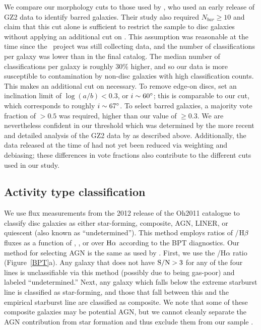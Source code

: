 We compare our morphology cuts to those used by \citet{Masters2011}, who used an early release of GZ2 data to identify barred galaxies. Their study also required $N_{bar}\ge10$ and claim that this cut alone is sufficient to restrict the sample to disc galaxies without applying an additional cut on \pfeatures. This assumption was reasonable at the time since the \gztwo~project was still collecting data, and the number of classifications per galaxy was lower than in the final catalog. The median number of classifications per galaxy is roughly 30\% higher, and so our data is more susceptible to contamination by non-disc galaxies with high classification counts. This makes an additional cut on \pfeatures necessary. To remove edge-on discs, \citet{Masters2011} set an inclination limit of $\log(a/b)<0.3$, or $i\sim60\mbox{$^\circ$}$; this is comparable to our \pnotedgeon cut, which corresponds to roughly $i\sim67\mbox{$^\circ$}$. To select barred galaxies, a majority vote fraction of \pbar$>0.5$ was required, higher than our value of \pbar$\ge0.3$. We are nevertheless confident in our threshold which was determined by the more recent and detailed analysis of the GZ2 data by \citet{Willett2013} as described above. Additionally, the data released at the time of \citet{Masters2011} had not yet been reduced via weighting and debiasing; these differences in vote fractions also contribute to the different cuts used in our study.
 
\subsection{Activity type classification}
\label{sec:Activity}
We use flux measurements from the 2012 release of the Oh2011 catalogue \citep{Oh2011} to classify disc galaxies as either star-forming, composite, AGN, LINER, or quiescent (also known as ``undetermined''). This method employs ratios of /$\rm H\beta$ fluxes as a function of , , or  over $\rm H\alpha$ according to the BPT diagnostics. Our method for selecting AGN is the same as used by \citet{Schawinski2007,Schawinski2010}. First, we use the /H$\alpha$ ratio (Figure~\ref{BPT}a). Any galaxy that does not have $\rm S/N>3$ for any of the four lines is unclassifiable via this method (possibly due to being gas-poor) and labeled ``undetermined.'' Next, any galaxy which falls below the \citet{Kewley2001} extreme starburst line is classified as star-forming, and those that fall between this and the \citet{Kauffmann2003a} empirical starburst line are classified as composite. We note that some of these composite galaxies may be potential AGN, but we cannot cleanly separate the AGN contribution from star formation and thus exclude them from our sample \citep{Schawinski2010}. 

